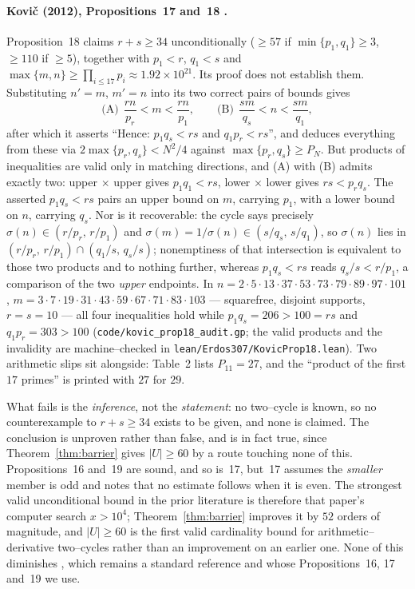 \documentclass[11pt]{article}
\theoremstyle{definition}
\begin{document}
\paragraph{Kovi\v{c} (2012), Propositions~17 and~18 \cite{Kovic2012}.}
Proposition~18 claims $r+s\ge34$ unconditionally ($\ge57$ if $\min\{p_1,q_1\}\ge3$, $\ge110$ if
$\ge5$), together with $p_1<r$, $q_1<s$ and $\max\{m,n\}\ge\prod_{i\le17}p_i\approx1.92\times
10^{21}$. Its proof does not establish them. Substituting $n'=m$, $m'=n$ into its two correct pairs
of bounds gives
\[ \text{(A)}\ \ \frac{rn}{p_r}<m<\frac{rn}{p_1}, \qquad
   \text{(B)}\ \ \frac{sm}{q_s}<n<\frac{sm}{q_1}, \]
after which it asserts ``Hence: $p_1q_s<rs$ and $q_1p_r<rs$'', and deduces everything from these via
$2\max\{p_r,q_s\}<N^2/4$ against $\max\{p_r,q_s\}\ge P_N$. But products of inequalities are valid
only in matching directions, and (A) with (B) admits exactly two: upper$\,\times\,$upper gives
$p_1q_1<rs$, lower$\,\times\,$lower gives $rs<p_rq_s$. The asserted $p_1q_s<rs$ pairs an upper bound
on $m$, carrying $p_1$, with a lower bound on $n$, carrying $q_s$. Nor is it recoverable: the cycle
says precisely $\sigma(n)\in(r/p_r,\,r/p_1)$ and $\sigma(m)=1/\sigma(n)\in(s/q_s,\,s/q_1)$, so
$\sigma(n)$ lies in $(r/p_r,\,r/p_1)\cap(q_1/s,\,q_s/s)$; nonemptiness of that intersection is
equivalent to those two products and to nothing further, whereas $p_1q_s<rs$ reads $q_s/s<r/p_1$, a
comparison of the two \emph{upper} endpoints. In
$n=2\cdot5\cdot13\cdot37\cdot53\cdot73\cdot79\cdot89\cdot97\cdot101$,
$m=3\cdot7\cdot19\cdot31\cdot43\cdot59\cdot67\cdot71\cdot83\cdot103$ --- squarefree, disjoint
supports, $r=s=10$ --- all four inequalities hold while $p_1q_s=206>100=rs$ and $q_1p_r=303>100$
(\texttt{code/kovic\_prop18\_audit.gp}; the valid products and the invalidity are machine--checked in
\texttt{lean/Erdos307/KovicProp18.lean}). Two arithmetic slips sit alongside: Table~2 lists
$P_{11}=27$, and the ``product of the first $17$ primes'' is printed with $27$ for $29$.

What fails is the \emph{inference}, not the \emph{statement}: no two--cycle is known, so no
counterexample to $r+s\ge34$ exists to be given, and none is claimed. The conclusion is unproven
rather than false, and is in fact true, since Theorem~\ref{thm:barrier} gives $|U|\ge60$ by a route
touching none of this. Propositions~16 and~19 are sound, and so is~17, but~17 assumes the
\emph{smaller} member is odd and \cite{Kovic2012} notes that no estimate follows when it is even. The
strongest valid unconditional bound in the prior literature is therefore that paper's computer search
$x>10^4$; Theorem~\ref{thm:barrier} improves it by $52$ orders of magnitude, and $|U|\ge60$ is the
first valid cardinality bound for arithmetic--derivative two--cycles rather than an improvement on an
earlier one. None of this diminishes \cite{Kovic2012}, which remains a standard reference and whose
Propositions~16, 17 and~19 we use.
\end{document}
